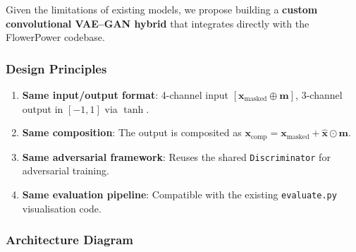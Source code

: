 \documentclass[11pt, a4paper]{article}
\begin{document}
Given the limitations of existing models, we propose building a \textbf{custom convolutional VAE--GAN hybrid} that integrates directly with the FlowerPower codebase.

\subsubsection{Design Principles}

\begin{enumerate}[leftmargin=2em]
  \item \textbf{Same input/output format}: 4-channel input \([\mathbf{x}_{\text{masked}} \oplus \mathbf{m}]\), 3-channel output in \([-1, 1]\) via \(\tanh\).
  \item \textbf{Same composition}: The output is composited as \(\mathbf{x}_{\text{comp}} = \mathbf{x}_{\text{masked}} + \hat{\mathbf{x}} \odot \mathbf{m}\).
  \item \textbf{Same adversarial framework}: Reuses the shared \texttt{Discriminator} for adversarial training.
  \item \textbf{Same evaluation pipeline}: Compatible with the existing \texttt{evaluate.py} visualisation code.
\end{enumerate}

\subsubsection{Architecture Diagram}
\end{document}
